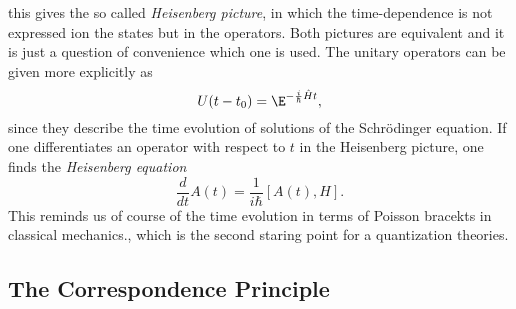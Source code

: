 this gives the so called \emph{Heisenberg picture}, in which the 
time-dependence is not expressed ion the states but in the operators. Both 
pictures are equivalent and it is just a question of convenience which one is 
used. The unitary operators can be given more explicitly as
\begin{equation*}
	U(t - t_0)
	=
	\E^{- \frac{i}{\hbar} \hat{H} t},
\end{equation*}
since they describe the time evolution of solutions of the Schr\"odinger 
equation. If one differentiates an operator with respect to $t$ in the 
Heisenberg picture, one finds the \emph{Heisenberg equation}
\begin{equation*}
	\frac{d}{dt}
	A(t)
	=
	\frac{1}{i \hbar}
	[A(t), H].
\end{equation*}
This reminds us of course of the time evolution in terms of Poisson bracekts in 
classical mechanics., which is the second staring point for a quantization 
theories.



\subsection{The Correspondence Principle}
\label{subsec:chap2_Correspondence}

